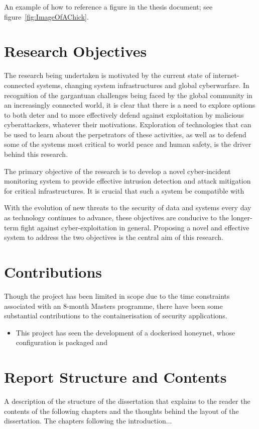 An example of how to reference a figure in the thesis document; see figure~\ref{fig:ImageOfAChick}.



\section{Research Objectives} 
The research being undertaken is motivated by the current state of internet-connected systems, changing system infrastructures and global cyberwarfare. In recognition of the gargantuan challenges being faced by the global community in an increasingly connected world, it is clear that there is a need to explore options to both deter and to more effectively defend against exploitation by malicious cyberattackers, whatever their motivations. Exploration of technologies that can be used to learn about the perpetrators of these activities, as well as to defend some of the systems most critical to world peace and human safety, is the driver behind this research. 

The primary objective of the research is to	develop a novel cyber-incident monitoring system to provide effective intrusion detection and attack mitigation for critical infrastructures. It is crucial that such a system be compatible with 

With the evolution of new threats to the security of data and systems every day as technology continues to advance, these objectives are conducive to the longer-term fight against cyber-exploitation in general. Proposing a novel and effective system to address the two objectives is the central aim of this research.

\section{Contributions}

Though the project has been limited in scope due to the time constraints associated with an 8-month Masters programme, there have been some substantial contributions to the containerisation of security applications.
\begin{itemize}
	\item This project has seen the development of a dockerised honeynet, whose configuration is packaged and 
\end{itemize}

\section{Report Structure and Contents}

A description of the structure of the dissertation that explains to the reader the contents of the following chapters and the thoughts behind the layout of the dissertation. The chapters following the introduction...